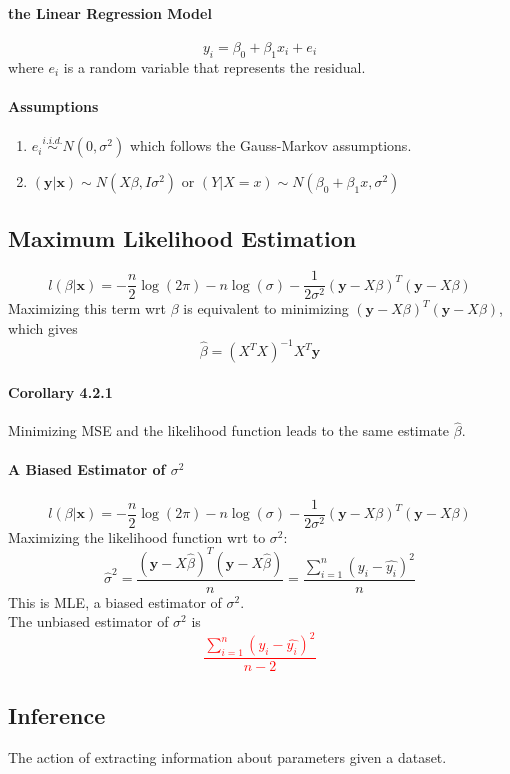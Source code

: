 \documentclass[11pt]{article}
\newcommand{\tb}[1]{\textbf{#1}}
\newcommand{\vx}[0]{\tb{x}}
\newcommand{\vy}[0]{\tb{y}}
\begin{document}
\paragraph{the Linear Regression Model}
$$y_i = \beta_0 + \beta_1x_i + e_i$$
where $e_i$ is a random variable that represents the residual. \\
\paragraph{Assumptions}
\begin{enumerate}
    \item $e_i \overset{i.i.d.}{\sim} N(0, \sigma^2)$ which follows the Gauss-Markov assumptions. 
    \item $(\vy|\vx) \sim N(X\beta, I\sigma^2)$ or $(Y|X = x) \sim N(\beta_0 + \beta_1x, \sigma^2)$
\end{enumerate}
\subsection{Maximum Likelihood Estimation}
$$l(\beta | \vx) = -\frac{n}{2}\log(2\pi) - n\log(\sigma) - \frac{1}{2\sigma^2} (\vy - X \beta)^T(\vy - X\beta)$$
Maximizing this term wrt $\beta$ is equivalent to minimizing $(\vy - X\beta)^T(\vy-X\beta)$, which gives $$\hat{\beta} = (X^TX)^{-1}X^T\vy$$
\paragraph{Corollary 4.2.1}
Minimizing MSE and the likelihood function leads to the same estimate $\hat{\beta}$.
\paragraph{A Biased Estimator of $\sigma^2$}
$$l(\beta | \vx) = -\frac{n}{2}\log(2\pi) - n\log(\sigma) - \frac{1}{2\sigma^2} (\vy - X \beta)^T(\vy - X\beta)$$
Maximizing the likelihood function wrt to $\sigma^2$:
$${\hat{\sigma}}^2 = \frac{(\vy - X\hat{\beta})^T(\vy-X\hat{\beta})}{n} = \frac{\sum_{i=1}^n(y_i-\hat{y_i})^2}{n}$$
This is MLE, a biased estimator of $\sigma^2$. \\
The unbiased estimator of $\sigma^2$ is \textcolor{red}{$$\frac{\sum_{i=1}^n(y_i-\hat{y_i})^2}{n-2}$$}
\subsection{Inference}
The action of extracting information about parameters given a dataset.\\
\end{document}

